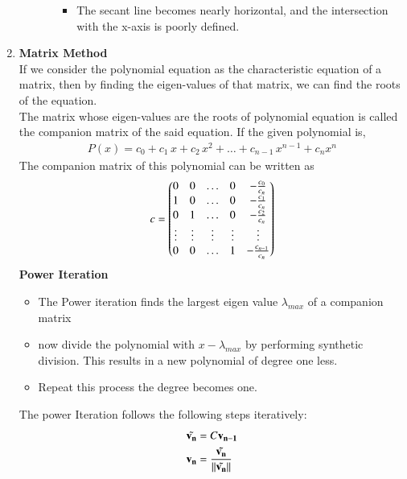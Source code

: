 \documentclass[journal]{IEEEtran}
\numberwithin{equation}{enumi}
\numberwithin{figure}{enumi}
\begin{document}
\begin{enumerate}
\begin{itemize}
\begin{itemize}
\begin{itemize}
                \item The secant line becomes nearly horizontal, and the intersection with the x-axis is poorly defined.
            \end{itemize}
        \end{itemize}
    \end{itemize}
    \item \textbf{Matrix Method}\\
    If we consider the polynomial equation as the characteristic equation of a matrix, then by finding the eigen-values of that matrix, we can find the roots of the equation.\\
    The matrix whose eigen-values are the roots of polynomial equation is called the companion matrix of the said equation.
     If the given polynomial is,
     \begin{align}
     	P(x) = c_0 + c_1\,x + c_2\,x^2 + \dots + c_{n-1}\,x^{n-1} + c_nx^n
     \end{align}
     The companion matrix of this polynomial can be written as
     \begin{align}
          c = \begin{pmatrix}0 & 0 & \dots & 0 & -\frac{c_0}{c_n}\\1 & 0 & \dots & 0 & -\frac{c_1}{c_n}\\0 & 1 & \dots & 0 & -\frac{c_2}{c_n}\\\vdots & \vdots & \vdots & \vdots &\vdots \\0 & 0 & \dots & 1 & -\frac{c_{n - 1}}{c_n}\end{pmatrix} \label{comp}
     \end{align}
    \textbf{Power Iteration}
    \begin{itemize}
        \item The Power iteration finds the largest eigen value $\lambda_{max}$ of a companion matrix 
        \item now divide the polynomial with $x - \lambda_{max}$ by performing synthetic division. This results in a new polynomial of degree one less.
        \item Repeat this process the degree becomes one.
    \end{itemize}

    The power Iteration follows the following steps iteratively:
    \begin{align}
        \Tilde{\mathbf{v_n}} &= C\mathbf{v_{n - 1}}\\
        \mathbf{v_n} &= \frac{\Tilde{\mathbf{v_n}}}{\left\lVert\Tilde{\mathbf{v_n}}\right\rVert}
    \end{align}


\end{enumerate}
\end{document}
